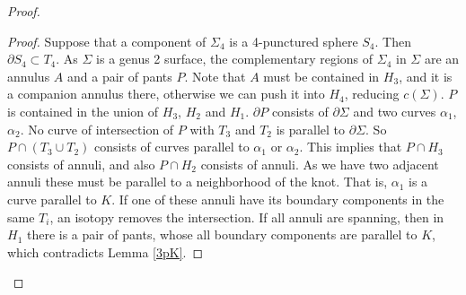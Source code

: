 \documentclass[12pt]{amsart}
\begin{document}
\begin{proof}
\begin{proof} Suppose that a component of $\Sigma_4$ is a 4-punctured sphere $S_4$. Then $\partial S_4 \subset T_4$. As $\Sigma$ is a genus 2 surface, the complementary regions of $\Sigma_4$ in $\Sigma$ are an annulus $A$ and a pair of pants $P$. Note that $A$ must be contained in $H_3$, and it is a companion annulus there,  otherwise we can push it into $H_4$, reducing $c(\Sigma)$. $P$ is contained in the union of $H_3$, $H_2$ and $H_1$. $\partial P$ consists of $\partial \Sigma$ and two curves $\alpha _1$, $\alpha_2$. No curve of intersection of $P$ with $T_3$ and $T_2$ is parallel to $\partial \Sigma$. So $P\cap (T_3 \cup T_2)$ consists of curves parallel to $\alpha_1$ or $\alpha_2$. This implies that $P\cap H_3$ consists of annuli, and also $P\cap H_2$ consists of annuli. As we have two adjacent annuli these must be parallel to a neighborhood of the knot. That is, $\alpha_1$ is a curve parallel to $K$. If one of these annuli have its boundary components in the same $T_i$, an isotopy removes the intersection. If all annuli are spanning, then in $H_1$ there is a pair of pants, whose all boundary components are parallel to $K$, which contradicts Lemma \ref{3pK}.
\end{proof}


\end{proof}
\end{document}
